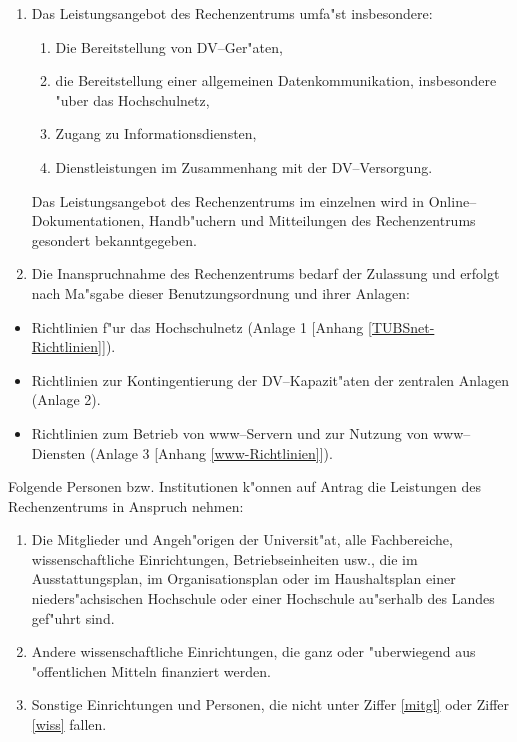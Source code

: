 \renewcommand{\labelenumi}{(\arabic{enumi})}
\renewcommand{\labelenumii}{\arabic{enumii}.}
\begin{enumerate}
  \item Das Leistungsangebot des Rechenzentrums umfa"st insbesondere:
    \begin{enumerate}
      \item Die Bereitstellung von DV--Ger"aten,
      \item die Bereitstellung einer allgemeinen Datenkommunikation,
        insbesondere "uber das Hochschulnetz,
      \item Zugang zu Informationsdiensten,
      \item Dienstleistungen im Zusammenhang mit der DV--Versorgung.
    \end{enumerate}

    Das Leistungsangebot des Rechenzentrums im einzelnen wird in
    Online--Do\-ku\-mentationen, Handb"uchern und Mitteilungen des
    Rechenzentrums gesondert bekanntgegeben.

  \item Die Inanspruchnahme des Rechenzentrums bedarf der Zulassung und erfolgt
    nach Ma"sgabe dieser Benutzungsordnung und ihrer Anlagen:
\end{enumerate}

\begin{itemize}
 \item Richtlinien f"ur das Hochschulnetz (Anlage 1 [Anhang
   \ref{TUBSnet-Richtlinien}]).
 \item Richtlinien zur Kontingentierung der DV--Kapazit"aten der
       zentralen Anlagen (Anlage 2).
 \item Richtlinien zum Betrieb von www--Servern und zur Nutzung von
       www--Diensten (Anlage 3 [Anhang \ref{www-Richtlinien}]).
\end{itemize}


Folgende Personen bzw. Institutionen k"onnen auf Antrag die Leistungen
des Rechenzentrums in Anspruch nehmen:

\begin{enumerate}
 \renewcommand{\labelenumi}{\arabic{enumi}.}
 \item \label{mitgl} Die Mitglieder und Angeh"origen der Universit"at, alle
       Fachbereiche, wissenschaftliche Einrichtungen, Betriebseinheiten
       usw., die im Ausstattungsplan, im Organisationsplan oder im
       Haushaltsplan einer nieders"achsischen Hochschule oder einer
       Hochschule au"serhalb des Landes gef"uhrt sind.
 \item \label{wiss} Andere wissenschaftliche Einrichtungen, die ganz oder
       "uberwiegend aus "offentlichen Mitteln finanziert
       werden.
 \item Sonstige Einrichtungen und Personen, die nicht unter
       Ziffer \ref{mitgl} oder Ziffer \ref{wiss} fallen.
\end{enumerate}


